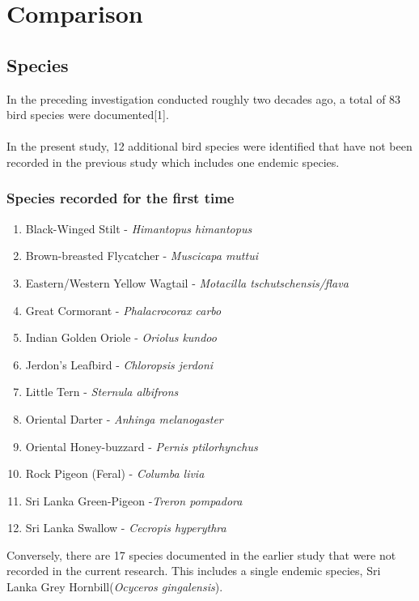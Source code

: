 \chapter{Comparison}
\label{cp:Comparative}
\section{Species}
In the preceding investigation conducted roughly two decades ago, a total of 83 bird species were documented[1]. 
\\\\
In the present study, 12 additional bird species were identified that have not been recorded in the previous study which includes one endemic species. 

\begin{importantbox}
\subsection{Species recorded for the first time}
\begin{enumerate}
    \item Black-Winged Stilt - \textit{Himantopus himantopus}
    \item Brown-breasted Flycatcher - \textit{Muscicapa muttui}
    \item Eastern/Western Yellow Wagtail - \textit{Motacilla tschutschensis/flava}
    \item Great Cormorant - \textit{Phalacrocorax carbo}
    \item Indian Golden Oriole - \textit{Oriolus kundoo}
    \item Jerdon's Leafbird - \textit{Chloropsis jerdoni}
    \item Little Tern - \textit{Sternula albifrons}
    \item Oriental Darter - \textit{Anhinga melanogaster}
    \item Oriental Honey-buzzard - \textit{Pernis ptilorhynchus}
    \item Rock Pigeon (Feral) - \textit{Columba livia}
    \item Sri Lanka Green-Pigeon -\textit{Treron pompadora}
    \item Sri Lanka Swallow - \textit{Cecropis hyperythra}
\end{enumerate}
\end{importantbox}

Conversely, there are 17 species documented in the earlier study that were not recorded in the current research. This includes a single endemic species, Sri Lanka Grey Hornbill(\textit{Ocyceros gingalensis}).
